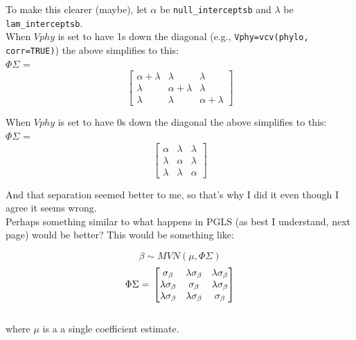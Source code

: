 \documentclass[11pt,letter]{article}
\begin{document}
To make this clearer (maybe), let $\alpha$ be  \verb|null_interceptsb| and $\lambda$ be \verb|lam_interceptsb|.\\

When $Vphy$ is set to have 1s down the diagonal (e.g., \verb|Vphy=vcv(phylo, corr=TRUE)|) the above simplifies to this:\\

$\Phi\Sigma$ = 
\begin{equation}
 \begin{bmatrix}
  \alpha+\lambda &   \lambda  & \lambda \\
    \lambda  & \alpha+ \lambda &  \lambda  \\
  \lambda &  \lambda  &   \alpha+\lambda
 \end{bmatrix}
\end{equation}

\vspace{2ex}
When $Vphy$ is set to have 0s down the diagonal the above simplifies to this:\\

$\Phi\Sigma$ = 
\begin{equation}
 \begin{bmatrix}
  \alpha &  \lambda & \lambda \\
   \lambda  &  \alpha & \lambda \\
  \lambda & \lambda &   \alpha
 \end{bmatrix}
\end{equation}
\vspace{2ex}

And that separation seemed better to me, so that's why I did it even though I agree it seems wrong. \\

Perhaps something similar to what happens in PGLS (as best I understand, next page) would be better? This would be something like:

\begin{equation}
\beta \sim MVN(\mu, \Phi\Sigma)
\end{equation}
\begin{equation}
\Phi\Sigma = \\
 \begin{bmatrix}
  \sigma_{\beta} &  \lambda \sigma_{\beta} & \lambda \sigma_{\beta} \\
  \lambda \sigma_{\beta}  & \sigma_{\beta} & \lambda \sigma_{\beta} \\
  \lambda \sigma_{\beta} & \lambda \sigma_{\beta} &   \sigma_{\beta}
 \end{bmatrix}
\end{equation}
\vspace{2ex}\\
where $\mu$ is a a single coefficient estimate. %
 
\end{document}

